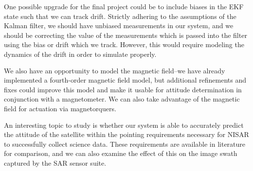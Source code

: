 One possible upgrade for the final project could be to include biases in the EKF state such that we can track drift. Strictly adhering to the assumptions of the Kalman filter, we should have unbiased measurements in our system, and we should be correcting the value of the measurements which is passed into the filter using the bias or drift which we track. However, this would require modeling the dynamics of the drift in order to simulate properly.

We also have an opportunity to model the magnetic field–we have already implemented a fourth-order magnetic field model, but additional refinements and fixes could improve this model and make it usable for attitude determination in conjunction with a magnetometer. We can also take advantage of the magnetic field for actuation via magnetorquers.

An interesting topic to study is whether our system is able to accurately predict the attitude of the satellite within the pointing requirements necessary for NISAR to successfully collect science data. These requirements are available in literature for comparison, and we can also examine the effect of this on the image swath captured by the SAR sensor suite.